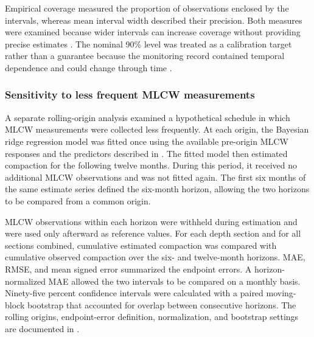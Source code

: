Empirical coverage measured the proportion of observations enclosed by the intervals, whereas mean interval width described their precision. Both measures were examined because wider intervals can increase coverage without providing precise estimates \citep{singh_uncertainty_2024}. The nominal 90\% level was treated as a calibration target rather than a guarantee because the monitoring record contained temporal dependence and could change through time \citep{zaffran_adaptive_2022}.

\subsubsection{Sensitivity to less frequent MLCW measurements}
\label{subsec:no_update_sensitivity}

A separate rolling-origin analysis examined a hypothetical schedule in which MLCW measurements were collected less frequently. At each origin, the Bayesian ridge regression model was fitted once using the available pre-origin MLCW responses and the predictors described in . The fitted model then estimated compaction for the following twelve months. During this period, it received no additional MLCW observations and was not fitted again. The first six months of the same estimate series defined the six-month horizon, allowing the two horizons to be compared from a common origin.

MLCW observations within each horizon were withheld during estimation and were used only afterward as reference values. For each depth section and for all sections combined, cumulative estimated compaction was compared with cumulative observed compaction over the six- and twelve-month horizons. MAE, RMSE, and mean signed error summarized the endpoint errors. A horizon-normalized MAE allowed the two intervals to be compared on a monthly basis. Ninety-five percent confidence intervals were calculated with a paired moving-block bootstrap that accounted for overlap between consecutive horizons. The rolling origins, endpoint-error definition, normalization, and bootstrap settings are documented in .

\FloatBarrier
